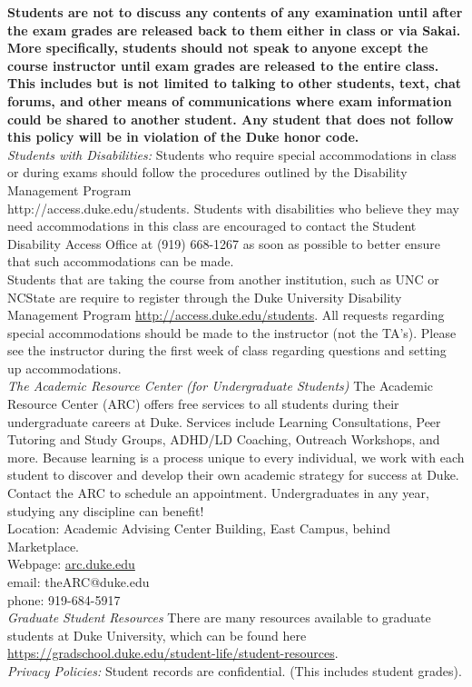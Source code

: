 \documentclass[11pt]{article}
\begin{document}
\textbf{Students are not to discuss any contents of any examination until after the exam grades are released back to them either in class or via Sakai. More specifically, students should not speak to anyone except the course instructor until exam grades are released to the entire class. This includes but is not limited to talking to other students, text, chat forums, and other means of communications where exam information could be shared to another student. Any student that does not follow this policy will be in violation of the Duke honor code.}\\


\emph{Students with Disabilities:} Students who require special accommodations in class or during exams should follow the procedures outlined by the Disability Management Program \\ http://access.duke.edu/students. Students with disabilities who believe they may need accommodations in this class are encouraged to contact the Student Disability Access Office at (919) 668-1267 as soon as possible to better ensure that such accommodations can be made. \\

Students that are taking the course from another institution, such as UNC or NCState are require to register through the Duke University Disability Management Program \url{http://access.duke.edu/students}. All requests regarding special accommodations should be made to the instructor (not the TA's). Please see the instructor during the first week of class regarding questions and setting up accommodations. \\

\emph{The Academic Resource Center (for Undergraduate Students)}
The Academic Resource Center (ARC) offers free services to all students during their undergraduate careers at Duke.  Services include Learning Consultations, Peer Tutoring and Study Groups, ADHD/LD Coaching, Outreach Workshops, and more. Because learning is a process unique to every individual, we work with each student to discover and develop their own academic strategy for success at Duke. Contact the ARC to schedule an appointment. Undergraduates in any year, studying any discipline can benefit! \\
Location: Academic Advising Center Building, East Campus,  behind Marketplace. \\
Webpage: \url{arc.duke.edu}\\
email: theARC@duke.edu \\
phone: 919-684-5917\\

\emph{Graduate Student Resources} There are many resources available to graduate students at Duke University, which can be found here \url{https://gradschool.duke.edu/student-life/student-resources}.\\

\emph{Privacy Policies:} 
Student records are confidential. (This includes student grades). 
\end{document}

